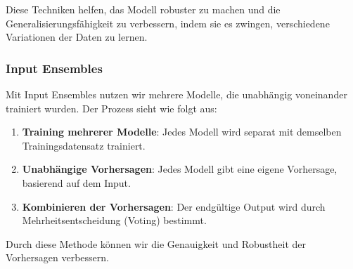Diese Techniken helfen, das Modell robuster zu machen und die Generalisierungsfähigkeit zu verbessern, indem sie es zwingen, verschiedene Variationen der Daten zu lernen.

\subsubsection{Input Ensembles}

Mit Input Ensembles nutzen wir mehrere Modelle, die unabhängig voneinander trainiert wurden. Der Prozess sieht wie folgt aus:

\begin{enumerate}
    \item \textbf{Training mehrerer Modelle}: Jedes Modell wird separat mit demselben Trainingsdatensatz trainiert.
    \item \textbf{Unabhängige Vorhersagen}: Jedes Modell gibt eine eigene Vorhersage, basierend auf dem Input.
    \item \textbf{Kombinieren der Vorhersagen}: Der endgültige Output wird durch Mehrheitsentscheidung (Voting) bestimmt. 
\end{enumerate}

Durch diese Methode können wir die Genauigkeit und Robustheit der Vorhersagen verbessern.